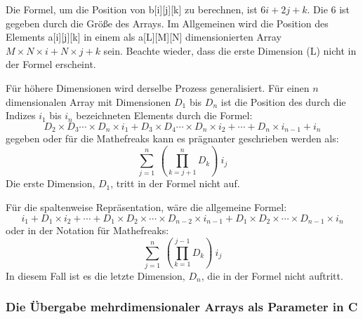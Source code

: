 \noindent Die Formel, um die Position von {\code b[i][j][k]} zu
berechnen, ist $6i + 2j + k$. Die 6 ist gegeben durch die Gr\"{o}{\ss}e des
{\code [3][2]} Arrays. Im Allgemeinen wird die Position des Elements
{\code a[i][j][k]} in einem als {\code a[L][M][N]} dimensionierten
Array $M\times N\times i + N \times j + k$ sein. Beachte wieder,
dass die erste Dimension ({\code L}) nicht in der Formel erscheint.

F\"{u}r h\"{o}here Dimensionen wird derselbe Prozess generalisiert. F\"{u}r
einen $n$ dimensionalen Array mit Dimensionen $D_1$ bis $D_n$ ist
die Position des durch die Indizes $i_1$ bis $i_n$ bezeichneten
Elements durch die Formel:
\begin{displaymath}
D_2 \times D_3 \cdots \times D_n \times i_1 + D_3 \times D_4 \cdots \times D_n
\times i_2 + \cdots + D_n \times i_{n-1} + i_n
\end{displaymath}
gegeben oder f\"{u}r die Mathefreaks kann es pr\"{a}gnanter geschrieben
werden als:
\begin{displaymath}
\sum_{j=1}^{n} \: \left( \prod_{k=j+1}^{n} D_k \right) \: i_j
\end{displaymath}
 Die erste Dimension, $D_1$, tritt in der Formel
nicht auf.

F\"{u}r die spaltenweise Repr\"{a}sentation, w\"{a}re die allgemeine Formel:
\begin{displaymath}
i_1 + D_1 \times i_2 + \cdots + D_1 \times D_2 \times \cdots \times D_{n-2}
\times i_{n-1} + D_1 \times D_2 \times \cdots \times D_{n-1} \times i_n
\end{displaymath}
oder in der Notation f\"{u}r Mathefreaks:
\begin{displaymath}
\sum_{j=1}^{n} \: \left( \prod_{k=1}^{j-1} D_k \right) \: i_j
\end{displaymath}
In diesem Fall ist es die letzte Dimension, $D_n$, die in der Formel
nicht auftritt.

\subsubsection{Die \"{U}bergabe mehrdimensionaler Arrays als Parameter in C
}

